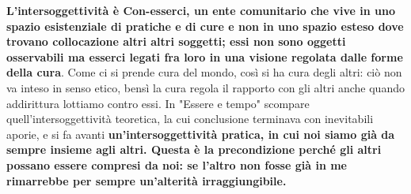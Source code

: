 \textbf{L'intersoggettività è Con-esserci, un ente comunitario che vive in uno spazio esistenziale di pratiche e di cure e non in uno spazio esteso dove trovano collocazione altri altri soggetti; essi non sono oggetti osservabili ma esserci legati fra loro in una visione regolata dalle forme della cura}. Come ci si prende cura del mondo, così si ha cura degli altri: ciò non va inteso in senso etico, bensì la cura regola il rapporto con gli altri anche quando addirittura lottiamo contro essi.
In "Essere e tempo" scompare quell'intersoggettività teoretica, la cui conclusione terminava con inevitabili aporie, e si fa avanti \textbf{un'intersoggettività pratica, in cui noi siamo già da sempre insieme agli altri. Questa è la precondizione perché gli altri possano essere compresi da noi: se l'altro non fosse già in me rimarrebbe per sempre un'alterità irraggiungibile.}



